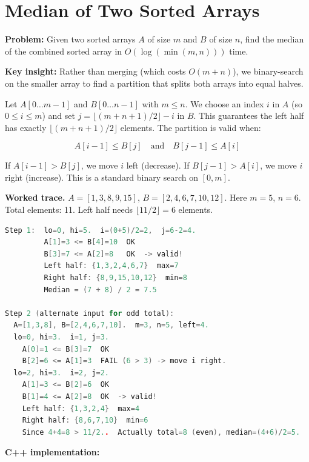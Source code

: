 \section{Median of Two Sorted Arrays}

\textbf{Problem:} Given two sorted arrays $A$ of size $m$ and $B$ of size $n$, find the median of the combined sorted array in $O(\log(\min(m, n)))$ time.

\textbf{Key insight:} Rather than merging (which costs $O(m + n)$), we binary-search on the smaller array to find a partition that splits both arrays into equal halves.

Let $A[0 \ldots m{-}1]$ and $B[0 \ldots n{-}1]$ with $m \leq n$. We choose an index $i$ in $A$ (so $0 \leq i \leq m$) and set $j = \lfloor(m + n + 1) / 2\rfloor - i$ in $B$. This guarantees the left half has exactly $\lfloor(m + n + 1) / 2\rfloor$ elements. The partition is valid when:

\[
A[i{-}1] \leq B[j] \quad \text{and} \quad B[j{-}1] \leq A[i]
\]

If $A[i{-}1] > B[j]$, we move $i$ left (decrease). If $B[j{-}1] > A[i]$, we move $i$ right (increase). This is a standard binary search on $[0, m]$.

\textbf{Worked trace.} $A = [1, 3, 8, 9, 15]$, $B = [2, 4, 6, 7, 10, 12]$. Here $m = 5$, $n = 6$. Total elements: 11. Left half needs $\lfloor 11/2 \rfloor = 6$ elements.

\begin{lstlisting}[language=C++]
Step 1:  lo=0, hi=5.  i=(0+5)/2=2,  j=6-2=4.
         A[1]=3 <= B[4]=10  OK
         B[3]=7 <= A[2]=8   OK  -> valid!
         Left half: {1,3,2,4,6,7}  max=7
         Right half: {8,9,15,10,12}  min=8
         Median = (7 + 8) / 2 = 7.5

Step 2 (alternate input for odd total):
  A=[1,3,8], B=[2,4,6,7,10].  m=3, n=5, left=4.
  lo=0, hi=3.  i=1, j=3.
    A[0]=1 <= B[3]=7  OK
    B[2]=6 <= A[1]=3  FAIL (6 > 3) -> move i right.
  lo=2, hi=3.  i=2, j=2.
    A[1]=3 <= B[2]=6  OK
    B[1]=4 <= A[2]=8  OK  -> valid!
    Left half: {1,3,2,4}  max=4
    Right half: {8,6,7,10}  min=6
    Since 4+4=8 > 11/2..  Actually total=8 (even), median=(4+6)/2=5.
\end{lstlisting}

\textbf{C++ implementation:}

